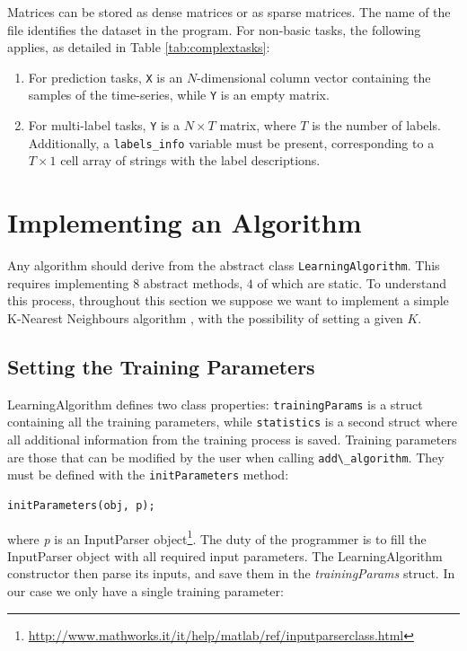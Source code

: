 Matrices can be stored as dense matrices or as sparse matrices. The name of the file identifies the dataset in the program. For non-basic tasks, the following applies, as detailed in Table \ref{tab:complextasks}:

\begin{enumerate}
	\item For prediction tasks, \verb|X| is an $N$-dimensional column vector containing the samples of the time-series, while \verb|Y| is an empty matrix.
	\item For multi-label tasks, \verb|Y| is a $N \times T$ matrix, where $T$ is the number of labels. Additionally, a \verb|labels_info| variable must be present, corresponding to a $T\times1$ cell array of strings with the label descriptions.
\end{enumerate}

\section{Implementing an Algorithm}

Any algorithm should derive from the abstract class \verb|LearningAlgorithm|. This requires implementing $8$ abstract methods, $4$ of which are static. To understand this process, throughout this section we suppose we want to implement a simple K-Nearest Neighbours algorithm \cite{alpaydin2004introduction}, with the possibility of setting a given $K$.

\subsection{Setting the Training Parameters}

LearningAlgorithm defines two class properties: \verb|trainingParams| is a struct containing all the training parameters, while \verb|statistics| is a second struct where all additional information from the training process is saved. Training parameters are those that can be modified by the user when calling \verb|add\_algorithm|. They must be defined with the \verb|initParameters| method:

\begin{lstlisting}
initParameters(obj, p);
\end{lstlisting}

\noindent where \textit{p} is an InputParser object\footnote{\url{http://www.mathworks.it/it/help/matlab/ref/inputparserclass.html}}. The duty of the programmer is to fill the InputParser object with all required input parameters. The LearningAlgorithm constructor then parse its inputs, and save them in the \textit{trainingParams} struct. In our case we only have a single training parameter:

